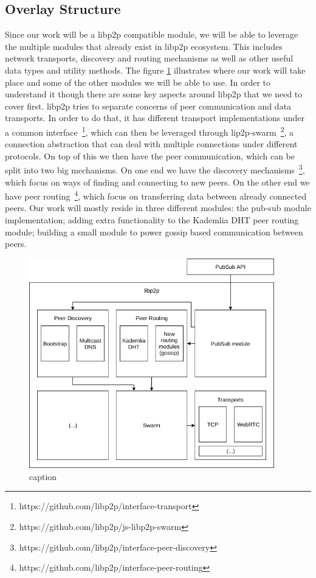 \subsection{Overlay Structure}\label{overlay-structure-solution}

Since our work will be a libp2p compatible module, we will be able to
leverage the multiple modules that already exist in libp2p ecosystem.
This includes network transports, discovery and routing mechanisms as
well as other useful data types and utility methods. The figure \ref{fig:libp2p-stack}
illustrates where our work will take place and
some of the other modules we will be able to use. In order to understand
it though there are some key aspects around libp2p that we need to cover
first. libp2p tries to separate concerns of peer communication and data
transports. In order to do that, it has different transport implementations
under a common interface~\footnote{https://github.com/libp2p/interface-transport},
which can then be leveraged through lip2p-swarm~\footnote{https://github.com/libp2p/js-libp2p-swarm},
a connection abstraction that can deal with multiple
connections under different protocols. On top of this we then have the
peer communication, which can be split into two big mechanisms. On one
end we have the discovery mechanisms~\footnote{https://github.com/libp2p/interface-peer-discovery},
which focus on ways of finding and connecting to new peers.
On the other end we have peer routing~\footnote{https://github.com/libp2p/interface-peer-routing},
which focus on transferring data between already connected
peers. Our work will mostly reside in three different modules: the
pub-sub module implementation; adding extra functionality to the
Kademlia DHT peer routing module; building a small module to power
gossip based communication between peers.

\begin{figure}[hb!]
  \centering
  \includegraphics[width=0.95\textwidth]{img/libp2p-stack.png}
  \caption{caption}
  \label{fig:libp2p-stack}
\end{figure}

